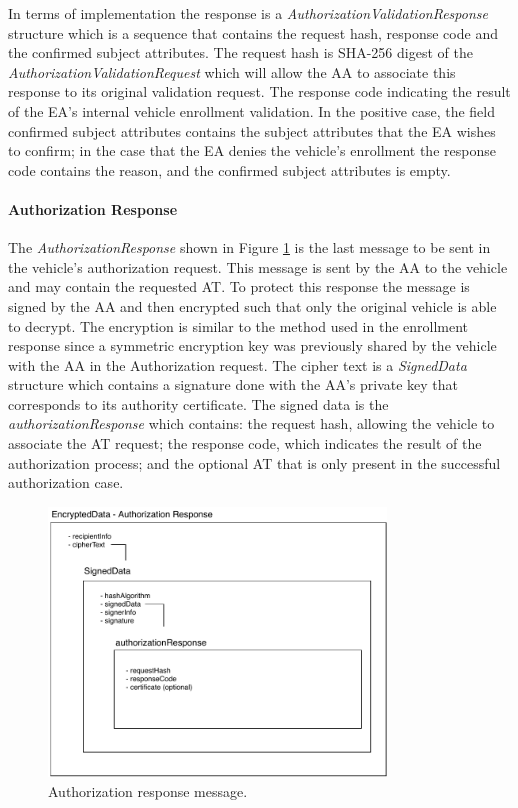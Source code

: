 In terms of implementation the response is a \textit{AuthorizationValidationResponse} structure which is a sequence that contains the request hash, response code and the confirmed subject attributes. The request hash is SHA-256 digest of the  \textit{AuthorizationValidationRequest} which will allow the AA to associate this response to its original validation request. The response code indicating the result of the EA's internal vehicle enrollment validation. In the positive case, the field confirmed subject attributes contains the subject attributes that the EA wishes to confirm; in the case that the EA denies the vehicle's enrollment the response code contains the reason, and the confirmed subject attributes is empty.

\paragraph{Authorization Response}
The \textit{AuthorizationResponse} shown in Figure \ref{fig:authorization_response} is the last message to be sent in the vehicle's authorization request. This message is sent by the AA to the vehicle and may contain the requested AT. To protect this response the message is signed by the AA and then encrypted such that only the original vehicle is able to decrypt. The encryption is similar to the method used in the enrollment response since a symmetric encryption key was previously shared by the vehicle with the AA in the Authorization request. The cipher text is a \textit{SignedData} structure which contains a signature done with the AA's private key that corresponds to its authority certificate. The signed data is the \textit{authorizationResponse} which contains: the request hash, allowing the vehicle to associate the AT request; the response code, which indicates the result of the authorization process; and the optional AT that is only present in the successful authorization case.
 
\begin{figure}[!htb]
	\centering
	\includegraphics[width=0.8\textwidth]{Figures/authorizationresponse}
	\caption{\label{fig:authorization_response}Authorization response message.}
\end{figure}


